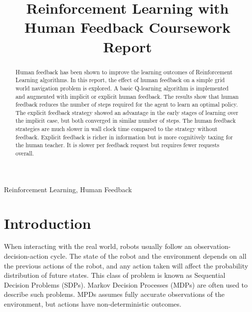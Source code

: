 \documentclass[conference]{IEEEtran}
\begin{document}
\title{Reinforcement Learning with Human Feedback Coursework Report}

\author{
}

\maketitle

\begin{abstract}
Human feedback has been shown to improve the learning outcomes of Reinforcement Learning algorithms. In this report, the effect of human feedback on a simple grid world navigation problem is explored. A basic Q-learning algorithm is implemented and augmented with implicit or explicit human feedback. The results show that human feedback reduces the number of steps required for the agent to learn an optimal policy. The explicit feedback strategy showed an advantage in the early stages of learning over the implicit case, but both converged in similar number of steps. The human feedback strategies are much slower in wall clock time compared to the strategy without feedback. Explicit feedback is richer in information but is more cognitively taxing for the human teacher. It is slower per feedback request but requires fewer requests overall.
\end{abstract}

\begin{IEEEkeywords}
    Reinforcement Learning, Human Feedback
\end{IEEEkeywords}

\section{Introduction}

When interacting with the real world, robots usually follow an observation-decision-action cycle. The state of the robot and the environment depends on all the previous actions of the robot, and any action taken will affect the probability distribution of future states. This class of problem is known as Sequential Decision Problems (SDPs). Markov Decision Processes (MDPs) \cite{putermanMarkovDecisionProcesses2014} are often used to describe such problems. MPDs assumes fully accurate observations of the environment, but actions have non-deterministic outcomes.
\end{document}
